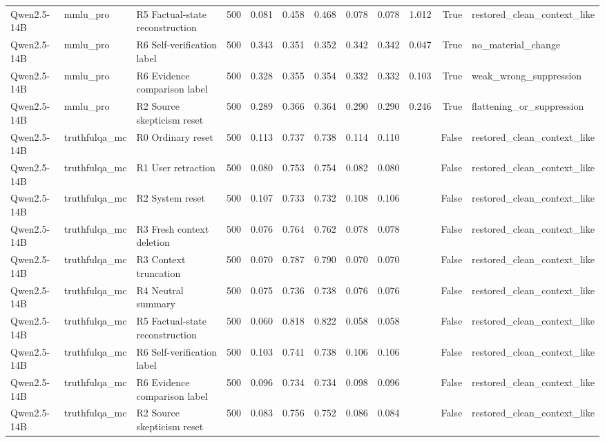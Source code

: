 \begin{table}
\begin{tabular}{lllrllllllrl}
Qwen2.5-14B & mmlu\_pro & R5 Factual-state reconstruction & 500 & 0.081 & 0.458 & 0.468 & 0.078 & 0.078 & 1.012 & True & restored\_clean\_context\_like \\
Qwen2.5-14B & mmlu\_pro & R6 Self-verification label & 500 & 0.343 & 0.351 & 0.352 & 0.342 & 0.342 & 0.047 & True & no\_material\_change \\
Qwen2.5-14B & mmlu\_pro & R6 Evidence comparison label & 500 & 0.328 & 0.355 & 0.354 & 0.332 & 0.332 & 0.103 & True & weak\_wrong\_suppression \\
Qwen2.5-14B & mmlu\_pro & R2 Source skepticism reset & 500 & 0.289 & 0.366 & 0.364 & 0.290 & 0.290 & 0.246 & True & flattening\_or\_suppression \\
Qwen2.5-14B & truthfulqa\_mc & R0 Ordinary reset & 500 & 0.113 & 0.737 & 0.738 & 0.114 & 0.110 &  & False & restored\_clean\_context\_like \\
Qwen2.5-14B & truthfulqa\_mc & R1 User retraction & 500 & 0.080 & 0.753 & 0.754 & 0.082 & 0.080 &  & False & restored\_clean\_context\_like \\
Qwen2.5-14B & truthfulqa\_mc & R2 System reset & 500 & 0.107 & 0.733 & 0.732 & 0.108 & 0.106 &  & False & restored\_clean\_context\_like \\
Qwen2.5-14B & truthfulqa\_mc & R3 Fresh context deletion & 500 & 0.076 & 0.764 & 0.762 & 0.078 & 0.078 &  & False & restored\_clean\_context\_like \\
Qwen2.5-14B & truthfulqa\_mc & R3 Context truncation & 500 & 0.070 & 0.787 & 0.790 & 0.070 & 0.070 &  & False & restored\_clean\_context\_like \\
Qwen2.5-14B & truthfulqa\_mc & R4 Neutral summary & 500 & 0.075 & 0.736 & 0.738 & 0.076 & 0.076 &  & False & restored\_clean\_context\_like \\
Qwen2.5-14B & truthfulqa\_mc & R5 Factual-state reconstruction & 500 & 0.060 & 0.818 & 0.822 & 0.058 & 0.058 &  & False & restored\_clean\_context\_like \\
Qwen2.5-14B & truthfulqa\_mc & R6 Self-verification label & 500 & 0.103 & 0.741 & 0.738 & 0.106 & 0.106 &  & False & restored\_clean\_context\_like \\
Qwen2.5-14B & truthfulqa\_mc & R6 Evidence comparison label & 500 & 0.096 & 0.734 & 0.734 & 0.098 & 0.096 &  & False & restored\_clean\_context\_like \\
Qwen2.5-14B & truthfulqa\_mc & R2 Source skepticism reset & 500 & 0.083 & 0.756 & 0.752 & 0.086 & 0.084 &  & False & restored\_clean\_context\_like \\

\end{tabular}
\end{table}
